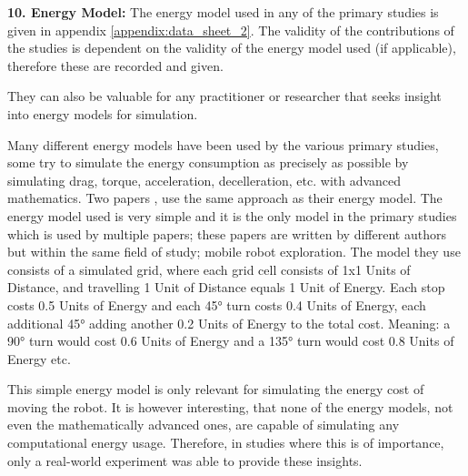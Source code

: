 \vspace{5mm}

\noindent\textbf{10. Energy Model:}
The energy model used in any of the primary studies is given in appendix \ref{appendix:data_sheet_2}.
The validity of the contributions of the studies is dependent on the validity of the energy model used (if applicable), 
therefore these are recorded and given.

\vspace{2mm}

They can also be valuable for any practitioner or researcher that seeks insight into energy models for simulation.

\vspace{2mm}

Many different energy models have been used by the various primary studies, some try to simulate the energy consumption 
as precisely as possible by simulating drag, torque, acceleration, decelleration, etc. with advanced mathematics. 
Two papers \cite{patel2012exploration_strategy, mei2006mobile_exploration}, use the same approach as their energy model.
The energy model used is very simple and it is the only model in the primary studies which is used by multiple papers;
these papers are written by different authors but within the same field of study; mobile robot exploration.
The model they use consists of a simulated grid, where each grid cell consists of 1x1 Units of Distance, 
and travelling 1 Unit of Distance equals 1 Unit of Energy.
Each stop costs 0.5 Units of Energy and each 45° turn costs 0.4 Units of Energy, each additional 45° adding another 
0.2 Units of Energy to the total cost.
Meaning: a 90° turn would cost 0.6 Units of Energy and a 135° turn would cost 0.8 Units of Energy etc.

\vspace{2mm}

This simple energy model is only relevant for simulating the energy cost of moving the robot.
It is however interesting, that none of the energy models, not even the mathematically advanced ones, are capable of 
simulating any computational energy usage.
Therefore, in studies where this is of importance, only a real-world experiment was able to provide these insights.


